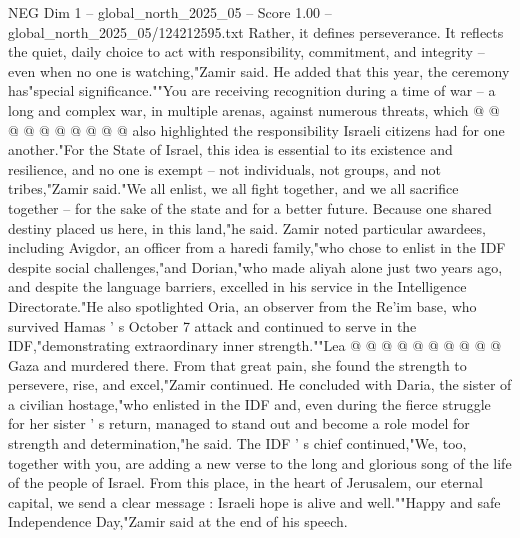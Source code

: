 \begin{textsample}{NEG Dim 1 – global\_north\_2025\_05 – Score 1.00 – global\_north\_2025\_05/124212595.txt}
Rather, it defines perseverance.
It reflects the quiet, daily choice to act with responsibility, commitment, and integrity -- even when no one is watching,"Zamir said.
He added that this year, the ceremony has"special significance.""You are receiving recognition during a time of war -- a long and complex war, in multiple arenas, against numerous threats, which @ @ @ @ @ @ @ @ @ @ also highlighted the responsibility Israeli citizens had for one another."For the State of Israel, this idea is essential to its existence and resilience, and no one is exempt -- not individuals, not groups, and not tribes,"Zamir said."We all enlist, we all fight together, and we all sacrifice together -- for the sake of the state and for a better future.
Because one shared destiny placed us here, in this land,"he said.
Zamir noted particular awardees, including Avigdor, an officer from a haredi family,"who chose to enlist in the IDF despite social challenges,"and Dorian,"who made aliyah alone just two years ago, and despite the language barriers, excelled in his service in the Intelligence Directorate."He also spotlighted Oria, an observer from the Re'im base, who survived Hamas ' s October 7 attack and continued to serve in the IDF,"demonstrating extraordinary inner strength.""Lea @ @ @ @ @ @ @ @ @ @ Gaza and murdered there.
From that great pain, she found the strength to persevere, rise, and excel,"Zamir continued.
He concluded with Daria, the sister of a civilian hostage,"who enlisted in the IDF and, even during the fierce struggle for her sister ' s return, managed to stand out and become a role model for strength and determination,"he said.
The IDF ' s chief continued,"We, too, together with you, are adding a new verse to the long and glorious song of the life of the people of Israel.
From this place, in the heart of Jerusalem, our eternal capital, we send a clear message : Israeli hope is alive and well.""Happy and safe Independence Day,"Zamir said at the end of his speech.

\end{textsample}

